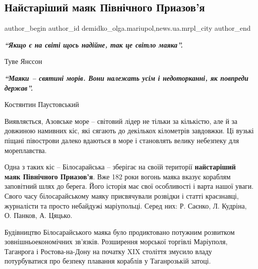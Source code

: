  
 
 
 
 
 
\subsection{Найстаріший маяк Північного Приазов'я}
\label{sec:30_06_2018.stz.news.ua.mrpl_city.2.najstar_majak_pivn_priazovja}
 
\ifcmt
 author_begin
   author_id demidko_olga.mariupol,news.ua.mrpl_city
 author_end
\fi

\vspace{0.5cm}
\begin{raggedright}
\emph{\textbf{\enquote{Якщо є на світі щось надійне, так це світло маяка}.}}

Туве Янссон

\emph{\textbf{\enquote{Маяки – святині морів. Вони належать усім і недоторканні, як повпреди держав}.}}

Костянтин Паустовський	
\end{raggedright}
\vspace{0.5cm}

Виявляється, Азовське море – світовий лідер не тільки за кількістю, але й за
довжиною намивних кіс, які сягають до декількох кілометрів завдовжки. Ці вузькі
піщані півострови далеко вдаються в море і становлять велику небезпеку для
мореплавства.

Одна з таких кіс – Білосарайська – зберігає на своїй території \textbf{найстаріший маяк
Північного Приазов'я}. Вже 182 роки вогонь маяка вказує кораблям заповітний шлях
до берега. Його історія має свої особливості і варта нашої уваги. Свого часу
білосарайському маяку присвячували розвідки і статті краєзнавці, журналісти та
просто небайдужі маріупольці. Серед них: Р. Саєнко, Л. Кудріна, О. Панков, А.
Цяцько.

Будівництво Білосарайського маяка було продиктовано потужним розвитком
зовнішньоекономічних зв'язків. Розширення морської торгівлі Маріуполя,
Таганрога і Ростова-на-Дону на початку XIX століття змусило владу потурбуватися
про безпеку плавання кораблів у Таганрозькій затоці.

